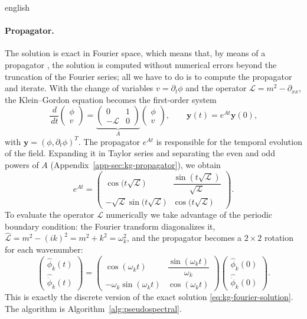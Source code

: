 \documentclass[../0000.tex]{subfiles}
\begin{document}
\begin{hyphenrules}{english}
\paragraph{Propagator.}
The solution is exact in Fourier space, which means that, by means of a propagator
\cite{hochbruck2010}, the solution is computed without numerical errors beyond the truncation of the
Fourier series; all we have to do is to compute the propagator and iterate. With the change of variables
$v=\partial_t\phi$ and the operator $\mathcal{L}=m^2-\partial_{xx}$, the Klein--Gordon equation becomes
the first-order system
\begin{equation}
  \frac{\,d}{\,d t}\begin{pmatrix}\phi\\ v\end{pmatrix}
  =\underbrace{\begin{pmatrix}0 & 1\\ -\mathcal{L} & 0\end{pmatrix}}_{A}
  \begin{pmatrix}\phi\\ v\end{pmatrix},
  \qquad\mathbf{y}(t)=e^{At}\mathbf{y}(0),
  \label{eq:kg-first-order}
\end{equation}
with $\mathbf{y}=(\phi,\partial_t\phi)^{T}$. The propagator $e^{At}$ is responsible for the temporal
evolution of the field. Expanding it in Taylor series and separating the even and odd powers of $A$
(Appendix~\ref{app-sec:kg-propagator}), we obtain
\begin{equation}
  e^{At}=\begin{pmatrix}
    \cos\big(t\sqrt{\mathcal{L}}\big) & \dfrac{\sin(t\sqrt{\mathcal{L}})}{\sqrt{\mathcal{L}}}\\[2mm]
    -\sqrt{\mathcal{L}}\sin\big(t\sqrt{\mathcal{L}}\big) & \cos\big(t\sqrt{\mathcal{L}}\big)
  \end{pmatrix}.
  \label{eq:kg-propagator}
\end{equation}
To evaluate the
operator $\mathcal{L}$ numerically we take advantage of the periodic boundary condition: the Fourier
transform diagonalizes it, $\widehat{\mathcal{L}}=m^2-(ik)^2=m^2+k^2=\omega_k^2$, and the propagator becomes
a $2\times2$ rotation for each wavenumber:
\begin{equation}
  \begin{pmatrix}\hat\phi_k(t)\\ \hat{\dot\phi}_k(t)\end{pmatrix}
  =\begin{pmatrix}
    \cos(\omega_kt) & \dfrac{\sin(\omega_kt)}{\omega_k}\\[2mm]
    -\omega_k\sin(\omega_kt) & \cos(\omega_kt)
  \end{pmatrix}
  \begin{pmatrix}\hat\phi_k(0)\\ \hat{\dot\phi}_k(0)\end{pmatrix}.
  \label{eq:kg-propagator-fourier}
\end{equation}
This is exactly the discrete version of the exact solution \eqref{eq:kg-fourier-solution}. The algorithm
is Algorithm~\ref{alg:pseudospectral}.


\end{hyphenrules}
\end{document}
